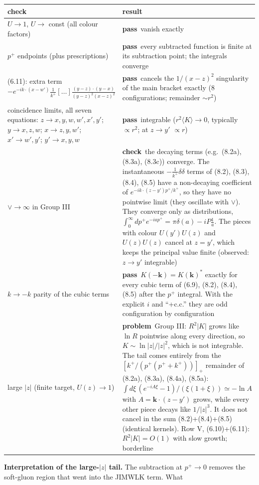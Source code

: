 \documentclass[10pt]{article}
\newcommand{\ok}{\textcolor{green!45!black}{\textbf{pass}}}
\newcommand{\bad}{\textcolor{red!70!black}{\textbf{problem}}}
\newcommand{\warn}{\textcolor{orange!85!black}{\textbf{check}}}
\begin{document}
\begin{center}
\begin{tabular}{p{5.6cm}p{9.8cm}}
\toprule
check & result\\
\midrule
$U\to1$, $U\to$ const (all colour factors) & \ok\ vanish exactly\\
$p^+$ endpoints (plus prescriptions) & \ok\ every subtracted function is finite at its subtraction point; the integrals converge\\
(6.11): extra term $-e^{-ik\cdot(x-w')}\frac1{k^+}[\dots]\frac{(y-z)\cdot(y-x)}{(y-z)^2(x-z)^2}$ & \ok\ cancels the $1/(x-z)^2$ singularity of the main bracket exactly (8 configurations; remainder $\sim r^2$)\\
coincidence limits, all seven equations: $z\to x,y,w,w',x',y'$; $y\to x,z,w$; $x\to z,y,w'$; $x'\to w',y'$; $y'\to x,y,w$ & \ok\ integrable ($r^2\langle K\rangle\to0$, typically $\propto r^2$; at $z\to y'$ $\propto r$)\\
$\vee\to\infty$ in Group III & \warn\ the decaying terms (e.g.\ (8.2a), (8.3a), (8.3c)) converge. The instantaneous $-\frac1{k^+}\delta\delta$ terms of (8.2), (8.3), (8.4), (8.5) have a non-decaying coefficient of $e^{-ik\cdot(z-y')p^+/k^+}$, so they have no pointwise limit (they oscillate with $\vee$). They converge only as distributions, $\int_0^\infty dp^+e^{-iap^+}=\pi\delta(a)-iP\frac1a$. The pieces with colour $U(y')U(z)$ and $U(z)U(z)$ cancel at $z=y'$, which keeps the principal value finite (observed: $z\to y'$ integrable)\\
$k\to-k$ parity of the cubic terms & \ok\ $K(-\mathbf k)=K(\mathbf k)^*$ exactly for every cubic term of (6.9), (8.2), (8.4), (8.5) after the $p^+$ integral. With the explicit $i$ and ``+c.c.'' they are odd configuration by configuration\\
large $|z|$ (finite target, $U(z)\to1$) & \bad\ Group III: $R^2|K|$ grows like $\ln R$ pointwise along every direction, so $K\sim\ln|z|/|z|^2$, which is not integrable. The tail comes entirely from the $[k^+/(p^+(p^+\!+\!k^+))]_+$ remainder of (8.2a), (8.3a), (8.4a), (8.5a): $\int d\xi\,(e^{-iA\xi}-1)/(\xi(1+\xi))\simeq-\ln A$ with $A=\mathbf k\cdot(z-y')$ grows, while every other piece decays like $1/|z|^3$. It does not cancel in the sum (8.2)+(8.4)+(8.5) (identical kernels). Row V, (6.10)+(6.11): $R^2|K|=O(1)$ with slow growth; borderline\\
\bottomrule
\end{tabular}
\end{center}
\textbf{Interpretation of the large-$|z|$ tail.} The subtraction at $p^+\to0$ removes the soft-gluon region that went into the JIMWLK term. What
\end{document}
